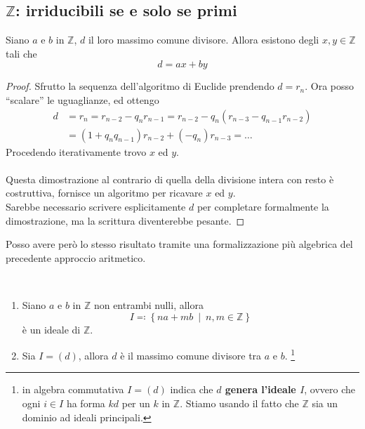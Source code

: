 \subsection{$\mathbb{Z}$: irriducibili se e solo se primi}
\begin{teorema} Siano $a$ e $b$ in $\mathbb{Z}$, $d$ il loro massimo comune divisore. Allora esistono degli $x,y \in \mathbb{Z}$ tali che
	\begin{equation*}
	d=ax+by
	\end{equation*}
\end{teorema}
\begin{proof}
	Sfrutto la sequenza dell'algoritmo di Euclide prendendo $d=r_n$. Ora posso \enquote{scalare} le uguaglianze, ed ottengo
	\begin{align*}
	d &  = r_n = r_{n-2}-q_nr_{n-1}= r_{n-2}-q_n(r_{n-3}-q_{n-1}r_{n-2}) \\ 
	& = (1+q_nq_{n-1})r_{n-2}+(-q_n)r_{n-3} = \dots
	\end{align*}
	Procedendo iterativamente trovo $x$ ed $y$. \\ \\ Questa dimostrazione al contrario di quella della divisione intera con resto è costruttiva, fornisce un algoritmo per ricavare $x$ ed $y$. \\ Sarebbe necessario scrivere esplicitamente $d$ per completare formalmente la dimostrazione, ma la scrittura diventerebbe pesante.
\end{proof}
Posso avere però lo stesso risultato tramite una formalizzazione più algebrica del precedente approccio aritmetico.
\begin{teorema} \
	\begin{enumerate}
		\item Siano $a$ e $b$ in $\mathbb{Z}$ non entrambi nulli, allora 
		\begin{equation*}
		I \eqqcolon \left\{na+mb \ \middle| \ n,m \in \mathbb{Z}\right\}
		\end{equation*}
		è un ideale di $\mathbb{Z}$.
		\item Sia $I = (d)$, allora $d$ è il massimo comune divisore tra $a$ e $b$. \footnote{in algebra commutativa $I=(d)$ indica che \textbf{$d$ genera l'ideale $I$}, ovvero che ogni $i \in I$ ha forma $kd$ per un $k$ in $\mathbb{Z}$. Stiamo usando il fatto che $\mathbb{Z}$ sia un dominio ad ideali principali.}
	\end{enumerate}
\end{teorema}
